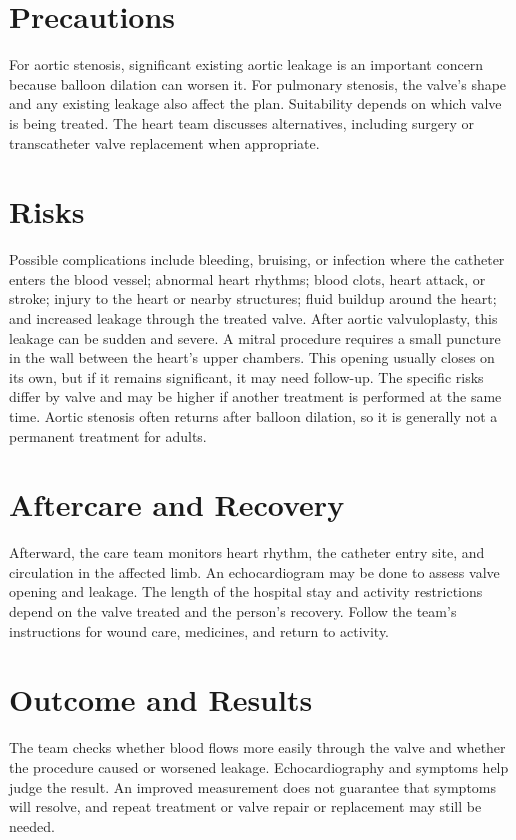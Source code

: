 \section*{Precautions}
For aortic stenosis, significant existing aortic leakage is an important concern because balloon dilation can worsen it. For pulmonary stenosis, the valve's shape and any existing leakage also affect the plan. Suitability depends on which valve is being treated. The heart team discusses alternatives, including surgery or transcatheter valve replacement when appropriate.

\section*{Risks}
Possible complications include bleeding, bruising, or infection where the catheter enters the blood vessel; abnormal heart rhythms; blood clots, heart attack, or stroke; injury to the heart or nearby structures; fluid buildup around the heart; and increased leakage through the treated valve. After aortic valvuloplasty, this leakage can be sudden and severe. A mitral procedure requires a small puncture in the wall between the heart's upper chambers. This opening usually closes on its own, but if it remains significant, it may need follow-up. The specific risks differ by valve and may be higher if another treatment is performed at the same time. Aortic stenosis often returns after balloon dilation, so it is generally not a permanent treatment for adults.

\section*{Aftercare and Recovery}
Afterward, the care team monitors heart rhythm, the catheter entry site, and circulation in the affected limb. An echocardiogram may be done to assess valve opening and leakage. The length of the hospital stay and activity restrictions depend on the valve treated and the person's recovery. Follow the team's instructions for wound care, medicines, and return to activity.

\section*{Outcome and Results}
The team checks whether blood flows more easily through the valve and whether the procedure caused or worsened leakage. Echocardiography and symptoms help judge the result. An improved measurement does not guarantee that symptoms will resolve, and repeat treatment or valve repair or replacement may still be needed.


